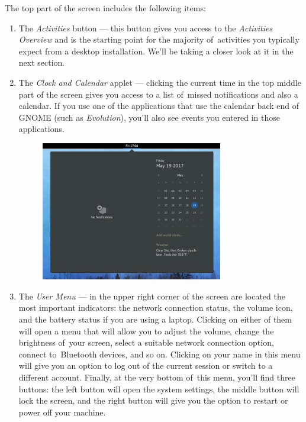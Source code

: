 \newpage
The top part of the screen includes the following items:
\begin{enumerate}
\item The \emph{Activities} button --- this button gives you access to the \emph{Activities Overview} and is the starting point for the majority of~activities you typically expect from a desktop installation. We'll be taking a closer look at it in the next section.

\item The \emph{Clock and Calendar} applet --- clicking the current time in the top middle part of the screen gives you access to a list of~missed notifications and also a calendar. If you use one of the applications that use the calendar back end of GNOME (such as \emph{Evolution}), you'll also see events you entered in those applications.

\begin{figure}[tbp]
\begin{center}
\includegraphics[width=0.75\textwidth]{img/calendar}
 \label{fig:calendar}
\end{center}
\end{figure}

\item The \emph{User Menu} --- in the upper right corner of the screen are located the most important indicators: the network connection status, the volume icon, and the battery status if you are using a laptop. Clicking on either of them will open a menu that will allow you to adjust the volume, change the brightness of~your screen, select a suitable network connection option, connect to~Bluetooth devices, and so on. Clicking on your name in this menu will give you an option to log out of the current session or switch to a different account. Finally, at the very bottom of~this menu, you'll find three buttons: the left button will open the system settings, the middle button will lock the screen, and the right button will give you the option to restart or power off your machine.


\end{enumerate}
